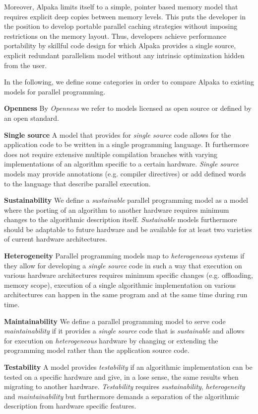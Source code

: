 \documentclass[10pt, twocolumn]{article}
\begin{document}
Moreover, Alpaka limits itself to a simple, pointer based memory model that requires explicit deep copies between memory levels.
This puts the developer in the position to develop portable parallel caching strategies without imposing restrictions on the memory layout.
Thus, developers achieve performance portability by skillful code design for which Alpaka provides a single source, explicit redundant parallelism model without any intrinsic optimization hidden from the user. 

In the following, we define some categories in order to compare Alpaka to existing models for parallel programming.


\textbf{Openness} By \emph{Openness} we refer to models licensed as open source or defined by an open standard.

\textbf{Single source} A model that provides for \emph{single source} code allows for the application code to be written in a single programming language. It furthermore does not require extensive multiple compilation branches with varying implementations of an algorithm specific to a certain hardware. \emph{Single source} models may provide annotations (e.g. compiler directives) or add defined words to the language that describe parallel execution.

\textbf{Sustainability} We define a \emph{sustainable} parallel programming model as a model where the porting of an algorithm to another hardware requires minimum changes to the algorithmic description itself. \emph{Sustainable} models furthermore should be adaptable to future hardware and be available for at least two varieties of current hardware architectures.

\textbf{Heterogeneity} Parallel programming models map to \emph{heterogeneous} systems if they allow for developing a \emph{single source} code in such a way that execution on various hardware architectures requires minimum specific changes (e.g. offloading, memory scope), execution of a single algorithmic implementation on various architectures can happen in the same program and at the same time during run time.

\textbf{Maintainability} We define a parallel programming model to serve code \emph{maintainability} if it provides a \emph{single source} code that is \emph{sustainable} and allows for execution on \emph{heterogeneous} hardware by changing or extending the programming model rather than the application source code.

\textbf{Testability} A model provides \emph{testability} if an algorithmic implementation can be tested on a specific hardware and give, in a lose sense, the same results when migrating to another hardware. \emph{Testability} requires \emph{sustainability}, \emph{heterogeneity} and \emph{maintainability} but furthermore demands a separation of the algorithmic description from hardware specific features.
\end{document}
